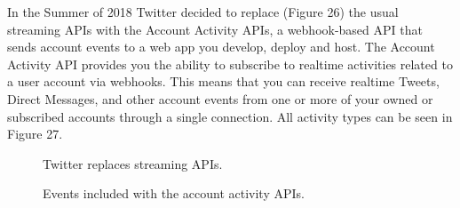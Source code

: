 \documentclass[12pt]{article} %
\begin{document}
\begin{enumerate}
		In the Summer of 2018 Twitter decided to replace (Figure 26) the usual streaming APIs with the Account Activity APIs,  a webhook-based API 
		that sends account events to a web app you develop, deploy and host.
		The Account Activity API provides you the ability to subscribe to realtime activities related to a user account via webhooks.
		This means that you can receive realtime Tweets, Direct Messages, and other account events from one or more of your owned or subscribed accounts 
		through a single connection. All activity types can be seen in Figure 27.
		\begin{figure}[H] %
		\caption{Twitter replaces streaming APIs.}
		\label{deprecatedStream}
		\end{figure}

		\begin{figure}[H] %
		\caption{Events included with the account activity APIs.}
		\label{activityAPIs}
		\end{figure}


\end{enumerate}
\end{document}
